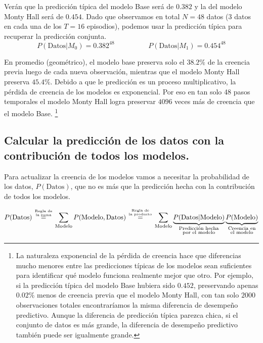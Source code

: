 \documentclass[a4paper,10pt]{article}
\begin{document}
\vspace{0.3cm}

Verán que la predicción típica del modelo Base será de $0.382$ y la del modelo Monty Hall será de $0.454$.
Dado que observamos en total $N=48$ datos ($3$ datos en cada una de los $T=16$ episodios), podemos usar la predicción típica para recuperar la predicción conjunta.
 $$P(\text{Datos}|M_0) = 0.382^{48}   \hspace{2cm}  P(\text{Datos}|M_1) = 0.454^{48}$$

En promedio (geométrico), el modelo base preserva solo el $38.2\%$ de la creencia previa luego de cada nueva observación, mientras que el modelo Monty Hall preserva $45.4\%$.
Debido a que le predicción es un proceso multiplicativo, la pérdida de creencia de los modelos es exponencial.
Por eso en tan solo 48 pasos temporales el modelo Monty Hall logra preservar $4096$ veces más de creencia que el modelo Base.
\footnote{La naturaleza exponencial de la pérdida de creencia hace que diferencias mucho menores entre las predicciones típicas de los modelos sean suficientes para identificar qué modelo funciona realmente mejor que otro.
Por ejemplo, si la predicción típica del modelo Base hubiera sido $0.452$, preservando apenas $0.02\%$ menos de creencia previa que el modelo Monty Hall, con tan solo $2000$ observaciones totales encontraríamos la misma diferencia de desempeño predictivo.
Aunque la diferencia de predicción típica parezca chica, si el conjunto de datos es más grande, la diferencia de desempeño predictivo también puede ser igualmente grande.}

\subsection{Calcular la predicción de los datos con la contribución de todos los modelos.}

Para actualizar la creencia de los modelos vamos a necesitar la probabilidad de los datos, $P(\text{Datos})$, que no es más que la predicción hecha con la contribución de todos los modelos.

$$P(\text{Datos}) \overset{\genfrac{}{}{0pt}{}{\text{Regla de}}{\text{la suma}} }{=} \sum_{\text{Modelo}} P(\text{Modelo},\text{Datos}) \overset{\genfrac{}{}{0pt}{}{\text{Regla de}}{\text{la producto}} }{=} \sum_{\text{Modelo}} \underbrace{P(\text{Datos}|\text{Modelo})}_{\hfrac{\text{\scriptsize Predicción hecha}}{\text{\scriptsize por el modelo}}} \underbrace{P(\text{Modelo})}_{\hfrac{\text{\scriptsize Creencia en}}{\text{\scriptsize el modelo}}}$$
\end{document}
